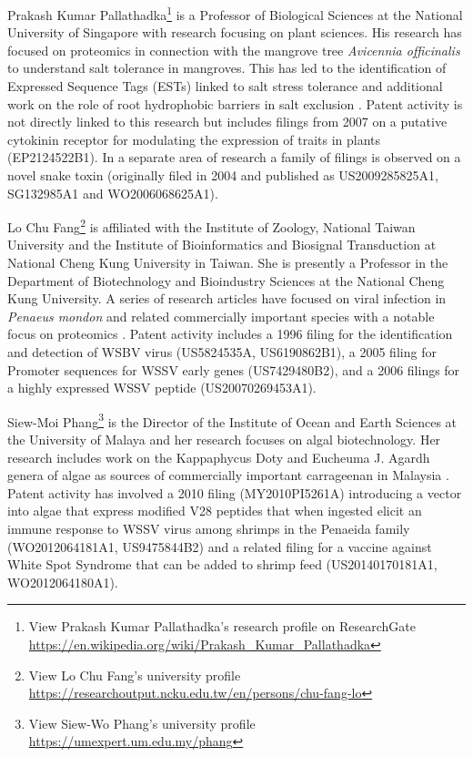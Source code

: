 \documentclass[]{book}
\let\rmarkdownfootnote\footnote%
\def\footnote{\protect\rmarkdownfootnote}
\theoremstyle{definition}
\theoremstyle{definition}
\theoremstyle{definition}
\theoremstyle{remark}
\begin{document}
Prakash Kumar Pallathadka\footnote{View Prakash Kumar Pallathadka's
  research profile on ResearchGate
  \url{https://en.wikipedia.org/wiki/Prakash_Kumar_Pallathadka}} is a
Professor of Biological Sciences at the National University of Singapore
with research focusing on plant sciences. His research has focused on
proteomics in connection with the mangrove tree \emph{Avicennia
officinalis} to understand salt tolerance in mangroves. This has led to
the identification of Expressed Sequence Tags (ESTs) linked to salt
stress tolerance and additional work on the role of root hydrophobic
barriers in salt exclusion
\citep{Krishnamurthy_2014, Jyothi_Prakash_2014, Krishnamurthy_2014a}.
Patent activity is not directly linked to this research but includes
filings from 2007 on a putative cytokinin receptor for modulating the
expression of traits in plants (EP2124522B1). In a separate area of
research a family of filings is observed on a novel snake toxin
(originally filed in 2004 and published as US2009285825A1, SG132985A1
and WO2006068625A1).

Lo Chu Fang\footnote{View Lo Chu Fang's university profile
  \url{https://researchoutput.ncku.edu.tw/en/persons/chu-fang-lo}} is
affiliated with the Institute of Zoology, National Taiwan University and
the Institute of Bioinformatics and Biosignal Transduction at National
Cheng Kung University in Taiwan. She is presently a Professor in the
Department of Biotechnology and Bioindustry Sciences at the National
Cheng Kung University. A series of research articles have focused on
viral infection in \emph{Penaeus mondon} and related commercially
important species with a notable focus on proteomics
\citep{Suraprasit_2014, Rattanarojpong_2007, Gonnet_2008}. Patent
activity includes a 1996 filing for the identification and detection of
WSBV virus (US5824535A, US6190862B1), a 2005 filing for Promoter
sequences for WSSV early genes (US7429480B2), and a 2006 filings for a
highly expressed WSSV peptide (US20070269453A1).

Siew-Moi Phang\footnote{View Siew-Wo Phang's university profile
  \url{https://umexpert.um.edu.my/phang}} is the Director of the
Institute of Ocean and Earth Sciences at the University of Malaya and
her research focuses on algal biotechnology. Her research includes work
on the Kappaphycus Doty and Eucheuma J. Agardh genera of algae as
sources of commercially important carrageenan in Malaysia
\citep{Tan_2012}. Patent activity has involved a 2010 filing
(MY2010PI5261A) introducing a vector into algae that express modified
V28 peptides that when ingested elicit an immune response to WSSV virus
among shrimps in the Penaeida family (WO2012064181A1, US9475844B2) and a
related filing for a vaccine against White Spot Syndrome that can be
added to shrimp feed (US20140170181A1, WO2012064180A1).
\end{document}
